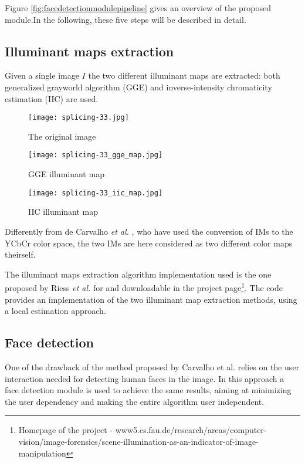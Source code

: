 Figure \ref{fig:facedetectionmodulepipeline} gives an overview of the proposed module.In the following, these five steps will be described in detail.

\subsection{Illuminant maps extraction}

Given a single image $I$ the two different illuminant maps are extracted: both generalized grayworld algorithm (GGE) and inverse-intensity chromaticity estimation (IIC) are used.

\begin{figure}[!htb]
\vspace{1cm}
  \texttt{[image: splicing-33.jpg]}
  \caption{The original image}\label{fig:awesome_image1}
\endminipage\hfill
{}
  \texttt{[image: splicing-33\_gge\_map.jpg]}
  \caption{GGE illuminant map}\label{fig:awesome_image2}
\endminipage\hfill
{}%
  \texttt{[image: splicing-33\_iic\_map.jpg]}
  \caption{IIC illuminant map}\label{fig:awesome_image3}
\endminipage
\end{figure}

Differently from de Carvalho \emph{et al.} \cite{carvalho2016illuminant}, who have used the conversion of IMs to the YCbCr color space, the two IMs are here considered as two different color maps theirself.

The illuminant maps extraction algorithm implementation used is the one proposed by Riess \emph{et al.} for \cite{riess2010scene} and downloadable in the project page\footnote{Homepage of the project \cite{riess2010scene} - www5.cs.fau.de/research/areas/computer-vision/image-forensics/scene-illumination-as-an-indicator-of-image-manipulation}. The code provides an implementation of the two illuminant map extraction methods, using a local estimation approach.

\subsection{Face detection}

One of the drawback of the method proposed by Carvalho et al. \cite{carvalho2016illuminant} relies on the user interaction needed for detecting human faces in the image. In this approach a face detection module is used to achieve the same results, aiming at minimizing the user dependency and making the entire algorithm user independent.

